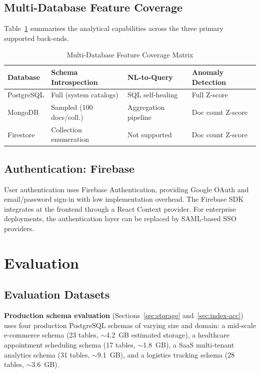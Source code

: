 \documentclass[conference]{IEEEtran}
\begin{document}
\subsection{Multi-Database Feature Coverage}

Table~\ref{tab:multidb} summarises the analytical capabilities across the
three primary supported back-ends.

\begin{table}[htbp]
\caption{Multi-Database Feature Coverage Matrix}
\label{tab:multidb}
\begin{tabular}{p{1.5cm} p{1.8cm} p{1.8cm} p{1.8cm}}
\toprule
\textbf{Database} & \textbf{Schema Introspection} & \textbf{NL-to-Query} & \textbf{Anomaly Detection} \\
\midrule
PostgreSQL & Full (system catalogs) & SQL self-healing & Full Z-score \\
MongoDB & Sampled (100 docs/coll.) & Aggregation pipeline & Doc count Z-score \\
Firestore & Collection enumeration & Not supported & Doc count Z-score \\
\bottomrule
\end{tabular}
\end{table}

\subsection{Authentication: Firebase}

User authentication uses Firebase Authentication, providing Google OAuth
and email/password sign-in with low implementation overhead. The Firebase
SDK integrates at the frontend through a React Context provider. For
enterprise deployments, the authentication layer can be replaced by
SAML-based SSO providers.

\section{Evaluation}

\subsection{Evaluation Datasets}

\textbf{Production schema evaluation} (Sections~\ref{sec:storage}
and~\ref{sec:index-acc}) uses four production PostgreSQL schemas of varying
size and domain: a mid-scale e-commerce schema (23 tables,
$\sim$4.2~GB estimated storage), a healthcare appointment scheduling schema
(17 tables, $\sim$1.8~GB), a SaaS multi-tenant analytics schema (31 tables,
$\sim$9.1~GB), and a logistics tracking schema (28 tables, $\sim$3.6~GB).
\end{document}
